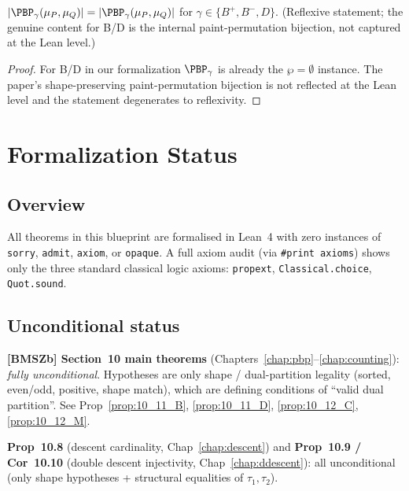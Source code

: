 \begin{proposition}
  \label{prop:10_2_BD}
  \leanok
  $|\PBP_\gamma(\mu_P, \mu_Q)| = |\PBP_\gamma(\mu_P, \mu_Q)|$ for $\gamma \in \{B^+, B^-, D\}$.
  (Reflexive statement; the genuine content for B/D is the internal paint-permutation bijection, not captured at the Lean level.)
\end{proposition}
\begin{proof}
  \leanok
  For B/D in our formalization $\PBP_\gamma$ is already the $\wp = \emptyset$ instance. The paper's shape-preserving paint-permutation bijection is not reflected at the Lean level and the statement degenerates to reflexivity.
\end{proof}



\chapter{Formalization Status}
\label{chap:status}

\section{Overview}

All theorems in this blueprint are formalised in Lean~4 with zero instances of
\texttt{sorry}, \texttt{admit}, \texttt{axiom}, or \texttt{opaque}. A full
axiom audit (via \texttt{\#print axioms}) shows only the three standard
classical logic axioms:
\texttt{propext}, \texttt{Classical.choice}, \texttt{Quot.sound}.

\section{Unconditional status}

\textbf{[BMSZb] Section~10 main theorems} (Chapters~\ref{chap:pbp}--\ref{chap:counting}):
\emph{fully unconditional}. Hypotheses are only shape / dual-partition legality
(sorted, even/odd, positive, shape match), which are defining conditions of
``valid dual partition''. See
Prop~\ref{prop:10_11_B}, \ref{prop:10_11_D}, \ref{prop:10_12_C}, \ref{prop:10_12_M}.

\textbf{Prop~10.8} (descent cardinality, Chap~\ref{chap:descent}) and
\textbf{Prop~10.9 / Cor~10.10} (double descent injectivity, Chap~\ref{chap:ddescent}):
all unconditional (only shape hypotheses + structural equalities of $\tau_1, \tau_2$).

